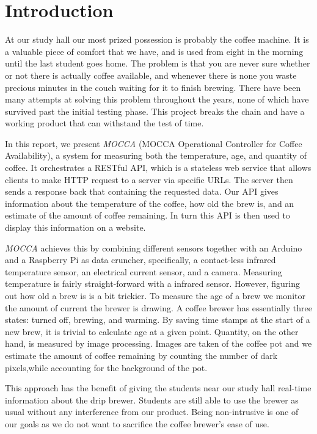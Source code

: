 \documentclass[12pt,a4paper,oneside,article]{memoir}
\numberwithin{equation}{chapter}
\begin{document}
\section{Introduction}\label{sec:introduction}
At our study hall our most prized possession is probably the coffee 
machine. It is a valuable piece of comfort that we have, and is used from eight 
in the morning until the last student goes home. The problem is that you are 
never sure whether or not there is actually coffee available, and whenever there 
is none you waste precious minutes in the couch waiting for it to finish 
brewing. There have been many attempts at solving this problem throughout the 
years, none of which have survived past the initial testing phase. This project 
breaks the chain and have a working product that can withstand the test of time.

In this report, we present \textit{MOCCA} (MOCCA Operational Controller for 
Coffee Availability), a system for measuring both the temperature, age, and 
quantity of coffee. It orchestrates a RESTful API, which is a stateless 
web service that allows clients to make HTTP request to a server via 
specific URLs. The server then sends a response back that containing the 
requested data. Our API gives information about the temperature of the coffee, 
how old the brew is, and an estimate of the amount of coffee remaining. In turn 
this API is then used to display this information on a website.

\textit{MOCCA} achieves this by combining different sensors together with an 
Arduino and a Raspberry Pi as data cruncher, specifically, a contact-less 
infrared temperature sensor, an electrical current sensor, and a camera. 
Measuring temperature is fairly straight-forward with a infrared sensor. 
However, figuring out how old a brew is is a bit trickier. To measure the age of 
a brew we monitor the amount of current the brewer is drawing. A coffee brewer 
has essentially three states: turned off, brewing, and warming. By saving time 
stamps at the start of a new brew, it is trivial to calculate age at a given 
point. Quantity, on the other hand, is measured by image processing. Images are 
taken of the coffee pot and we estimate the amount of coffee remaining by 
counting the number of dark pixels,while accounting for the background of the 
pot.

This approach has the benefit of giving the students near our study hall 
real-time information about the drip brewer. Students are still able to use the 
brewer as usual without any interference from our product. Being non-intrusive 
is one of our goals as we do not want to sacrifice the coffee brewer's ease 
of use.
\end{document}
